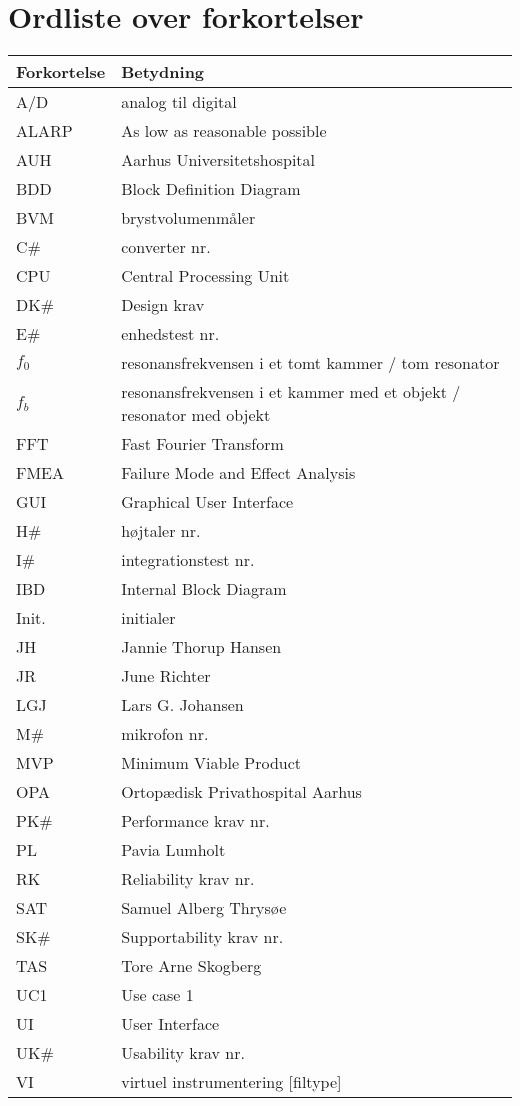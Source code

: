 \section*{Ordliste over forkortelser}

\vspace{1cm}
\begin{table}[hbt]
\centering
\label{ordliste}
\begin{tabular}{|l|l|}
\hline
\textbf{Forkortelse             } & \textbf{Betydning             } \\ \hline
A/D & analog til digital \\ \hline
ALARP & As low as reasonable possible \\ \hline
AUH & Aarhus Universitetshospital \\ \hline
BDD & Block Definition Diagram \\ \hline
BVM & brystvolumenmåler \\ \hline
C\# & converter nr. \\ \hline
CPU & Central Processing Unit \\ \hline
DK\# & Design krav \\ \hline
E\# & enhedstest nr. \\ \hline
$f_{0}$ & resonansfrekvensen i et tomt kammer / tom resonator \\ \hline 
$f_{b}$ & resonansfrekvensen i et kammer med et objekt / resonator med objekt \\ \hline
FFT & Fast Fourier Transform \\ \hline 
FMEA & Failure Mode and Effect Analysis\\ \hline
GUI & Graphical User Interface \\ \hline
H\# & højtaler nr. \\ \hline
I\# & integrationstest nr. \\ \hline
IBD & Internal Block Diagram \\ \hline 
Init. & initialer \\ \hline 
JH & Jannie Thorup Hansen \\ \hline
JR & June Richter  \\ \hline
LGJ & Lars G. Johansen \\ \hline
M\# & mikrofon nr. \\ \hline
MVP & Minimum Viable Product \\ \hline
OPA & Ortopædisk Privathospital Aarhus \\ \hline
PK\# & Performance krav nr. \\ \hline
PL & Pavia Lumholt \\ \hline
RK & Reliability krav nr. \\ \hline
SAT & Samuel Alberg Thrysøe \\ \hline
SK\# & Supportability krav nr. \\ \hline 
TAS & Tore Arne Skogberg \\ \hline
UC1 & Use case 1 \\ \hline
UI & User Interface \\ \hline
UK\# & Usability krav nr. \\ \hline
VI & virtuel instrumentering [filtype] \\ \hline
\end{tabular}
\end{table}
